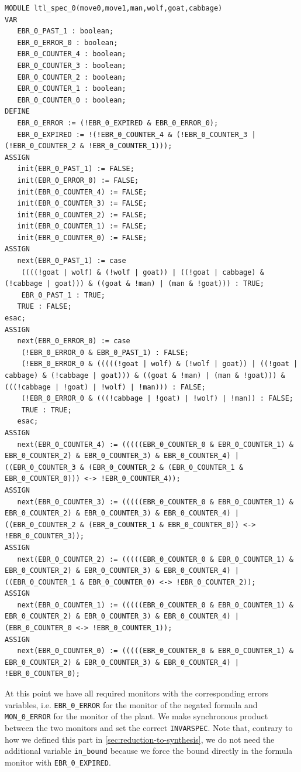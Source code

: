 \begin{lstlisting}[language=smv, caption=Ferryman ASAP: formula monitor with bound $8$]
MODULE ltl_spec_0(move0,move1,man,wolf,goat,cabbage)
VAR
   EBR_0_PAST_1 : boolean;
   EBR_0_ERROR_0 : boolean;
   EBR_0_COUNTER_4 : boolean;
   EBR_0_COUNTER_3 : boolean;
   EBR_0_COUNTER_2 : boolean;
   EBR_0_COUNTER_1 : boolean;
   EBR_0_COUNTER_0 : boolean;
DEFINE
   EBR_0_ERROR := (!EBR_0_EXPIRED & EBR_0_ERROR_0);
   EBR_0_EXPIRED := !(!EBR_0_COUNTER_4 & (!EBR_0_COUNTER_3 | (!EBR_0_COUNTER_2 & !EBR_0_COUNTER_1)));
ASSIGN
   init(EBR_0_PAST_1) := FALSE;
   init(EBR_0_ERROR_0) := FALSE;
   init(EBR_0_COUNTER_4) := FALSE;
   init(EBR_0_COUNTER_3) := FALSE;
   init(EBR_0_COUNTER_2) := FALSE;
   init(EBR_0_COUNTER_1) := FALSE;
   init(EBR_0_COUNTER_0) := FALSE;
ASSIGN
   next(EBR_0_PAST_1) := case
    ((((!goat | wolf) & (!wolf | goat)) | ((!goat | cabbage) & (!cabbage | goat))) & ((goat & !man) | (man & !goat))) : TRUE;
    EBR_0_PAST_1 : TRUE;
   TRUE : FALSE;
esac;
ASSIGN
   next(EBR_0_ERROR_0) := case
    (!EBR_0_ERROR_0 & EBR_0_PAST_1) : FALSE;
    (!EBR_0_ERROR_0 & (((((!goat | wolf) & (!wolf | goat)) | ((!goat | cabbage) & (!cabbage | goat))) & ((goat & !man) | (man & !goat))) & (((!cabbage | !goat) | !wolf) | !man))) : FALSE;
    (!EBR_0_ERROR_0 & (((!cabbage | !goat) | !wolf) | !man)) : FALSE;
    TRUE : TRUE;
   esac;
ASSIGN
   next(EBR_0_COUNTER_4) := (((((EBR_0_COUNTER_0 & EBR_0_COUNTER_1) & EBR_0_COUNTER_2) & EBR_0_COUNTER_3) & EBR_0_COUNTER_4) | ((EBR_0_COUNTER_3 & (EBR_0_COUNTER_2 & (EBR_0_COUNTER_1 & EBR_0_COUNTER_0))) <-> !EBR_0_COUNTER_4));
ASSIGN
   next(EBR_0_COUNTER_3) := (((((EBR_0_COUNTER_0 & EBR_0_COUNTER_1) & EBR_0_COUNTER_2) & EBR_0_COUNTER_3) & EBR_0_COUNTER_4) | ((EBR_0_COUNTER_2 & (EBR_0_COUNTER_1 & EBR_0_COUNTER_0)) <-> !EBR_0_COUNTER_3));
ASSIGN
   next(EBR_0_COUNTER_2) := (((((EBR_0_COUNTER_0 & EBR_0_COUNTER_1) & EBR_0_COUNTER_2) & EBR_0_COUNTER_3) & EBR_0_COUNTER_4) | ((EBR_0_COUNTER_1 & EBR_0_COUNTER_0) <-> !EBR_0_COUNTER_2));
ASSIGN
   next(EBR_0_COUNTER_1) := (((((EBR_0_COUNTER_0 & EBR_0_COUNTER_1) & EBR_0_COUNTER_2) & EBR_0_COUNTER_3) & EBR_0_COUNTER_4) | (EBR_0_COUNTER_0 <-> !EBR_0_COUNTER_1));
ASSIGN
   next(EBR_0_COUNTER_0) := (((((EBR_0_COUNTER_0 & EBR_0_COUNTER_1) & EBR_0_COUNTER_2) & EBR_0_COUNTER_3) & EBR_0_COUNTER_4) | !EBR_0_COUNTER_0);
\end{lstlisting}

At this point we have all required monitors with the corresponding errors variables, i.e. \lstinline{EBR_0_ERROR} for the monitor of the negated formula and \lstinline{MON_0_ERROR} for the monitor of the plant.
We make synchronous product between the two monitors and set the correct \lstinline{INVARSPEC}.
Note that, contrary to how we defined this part in \autoref{sec:reduction-to-synthesis}, we do not need the additional variable \lstinline{in_bound} because we force the bound directly in the formula monitor with \lstinline{EBR_0_EXPIRED}.

